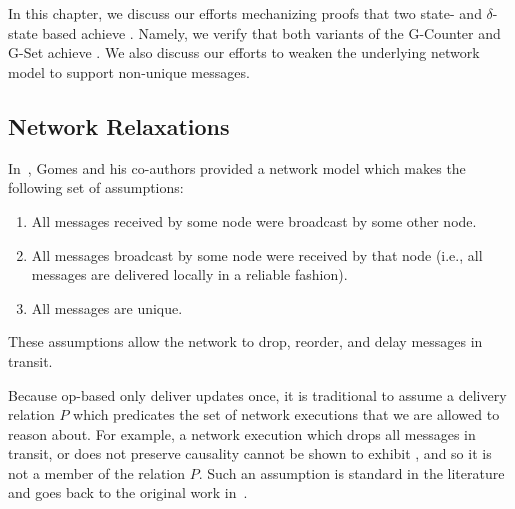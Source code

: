\chapter{\TODO}
\label{chap:results}

%
% 
%
% 
%
% 
%
% 
%

In this chapter, we discuss our efforts mechanizing proofs that two state- and
$\delta$-state based \CRDTs achieve \SEC. Namely, we verify that both variants
of the G-Counter and G-Set achieve \SEC. We also discuss our efforts to weaken
the underlying network model to support non-unique messages. \TODO

\section{Network Relaxations}
\label{sec:network-relaxations}
In~\citep{gomes17}, Gomes and his co-authors provided a network model which
makes the following set of assumptions:
\begin{enumerate}
  \item All messages received by some node were broadcast by some other node.
  \item All messages broadcast by some node were received by that node (i.e.,
    all messages are delivered locally in a reliable fashion).
  \item All messages are unique.
\end{enumerate}
These assumptions allow the network to drop, reorder, and delay messages in
transit.

Because op-based \CRDTs only deliver updates once, it is traditional to assume a
delivery relation $P$ which predicates the set of network executions that we are
allowed to reason about. For example, a network execution which drops all
messages in transit, or does not preserve causality cannot be shown to exhibit
\SEC, and so it is not a member of the relation $P$.  Such an assumption is
standard in the literature and goes back to the original work
in~\citep{shapiro11}.

